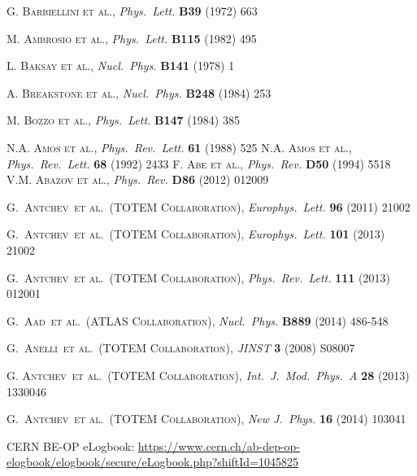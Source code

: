 \documentclass[TOTEM]{cern/cernphprep}
\def\etal{et al.}
\def\etal{et al.}
\def\Name#1{\textsc{#1}, }
\def\REVIEW#1#2#3#4{{\it #1} {\bf #2} (#3) #4}
\begin{document}
\begin{thebibliography}{99}
%
 \Name{G. Barbiellini et al.} \REVIEW{Phys.~Lett.}{B39}{1972}{663}

 \Name{M. Ambrosio et al.} \REVIEW{Phys.~Lett.}{B115}{1982}{495}

 \Name{L. Baksay et al.} \REVIEW{Nucl.~Phys.}{B141}{1978}{1}

 \Name{A. Breakstone et al.} \REVIEW{Nucl.~Phys.}{B248}{1984}{253}

 \Name{M. Bozzo et al.} \REVIEW{Phys.~Lett.}{B147}{1984}{385}

 \Name{N.A. Amos et al.} \REVIEW{Phys.~Rev.~Lett.}{61}{1988}{525}
 \Name{N.A. Amos et al.} \REVIEW{Phys.~Rev.~Lett.}{68}{1992}{2433}
 \Name{F. Abe et al.} \REVIEW{Phys.~Rev.}{D50}{1994}{5518}
 \Name{V.M. Abazov et al.} \REVIEW{Phys.~Rev.}{D86}{2012}{012009}

	\Name{G.~Antchev~\etal{}~(TOTEM Collaboration)}
	\REVIEW{Europhys.~Lett.}{96}{2011}{21002}

	\Name{G.~Antchev~\etal{}~(TOTEM Collaboration)}
	\REVIEW{Europhys.~Lett.}{101}{2013}{21002}

	\Name{G.~Antchev~\etal{}~(TOTEM Collaboration)}
	\REVIEW{Phys.~Rev.~Lett.}{111}{2013}{012001}

	\Name{G.~Aad~\etal{}~(ATLAS Collaboration)}
	\REVIEW{Nucl.~Phys.}{B889}{2014}{486-548}

	\Name{G.~Anelli~\etal{}~(TOTEM Collaboration)}
	\REVIEW{JINST}{3}{2008}{S08007}


	\Name{G. Antchev~\etal{}~(TOTEM Collaboration)}
	\REVIEW{Int.~J.~Mod.~Phys.~A}{28}{2013}{1330046}

	\Name{G.~Antchev~\etal{}~(TOTEM Collaboration)}
	\REVIEW{New J.~Phys.}{16}{2014}{103041}

 CERN BE-OP eLogbook: \url{https://www.cern.ch/ab-dep-op-elogbook/elogbook/secure/eLogbook.php?shiftId=1045825}


\end{thebibliography}
\end{document}

